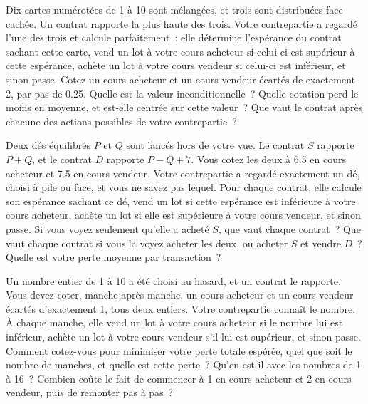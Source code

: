 \begin{question}\label{iq:iv2:making-a-market:30}
Dix cartes numérotées de 1 à 10 sont mélangées, et trois sont distribuées face cachée. Un contrat rapporte la plus haute des trois. Votre contrepartie a regardé l'une des trois et calcule parfaitement~: elle détermine l'espérance du contrat sachant cette carte, vend un lot à votre cours acheteur si celui-ci est supérieur à cette espérance, achète un lot à votre cours vendeur si celui-ci est inférieur, et sinon passe. Cotez un cours acheteur et un cours vendeur écartés de exactement 2, par pas de 0.25. Quelle est la valeur inconditionnelle~? Quelle cotation perd le moins en moyenne, et est-elle centrée sur cette valeur~? Que vaut le contrat après chacune des actions possibles de votre contrepartie~?
\end{question}

\begin{question}\label{iq:iv2:making-a-market:31}
Deux dés équilibrés $P$ et $Q$ sont lancés hors de votre vue. Le contrat $S$ rapporte $P + Q$, et le contrat $D$ rapporte $P - Q + 7$. Vous cotez les deux à 6.5 en cours acheteur et 7.5 en cours vendeur. Votre contrepartie a regardé exactement un dé, choisi à pile ou face, et vous ne savez pas lequel. Pour chaque contrat, elle calcule son espérance sachant ce dé, vend un lot si cette espérance est inférieure à votre cours acheteur, achète un lot si elle est supérieure à votre cours vendeur, et sinon passe. Si vous voyez seulement qu'elle a acheté $S$, que vaut chaque contrat~? Que vaut chaque contrat si vous la voyez acheter les deux, ou acheter $S$ et vendre $D$~? Quelle est votre perte moyenne par transaction~?
\end{question}

\begin{question}\label{iq:iv2:making-a-market:32}
Un nombre entier de 1 à 10 a été choisi au hasard, et un contrat le rapporte. Vous devez coter, manche après manche, un cours acheteur et un cours vendeur écartés d'exactement 1, tous deux entiers. Votre contrepartie connaît le nombre. À chaque manche, elle vend un lot à votre cours acheteur si le nombre lui est inférieur, achète un lot à votre cours vendeur s'il lui est supérieur, et sinon passe. Comment cotez-vous pour minimiser votre perte totale espérée, quel que soit le nombre de manches, et quelle est cette perte~? Qu'en est-il avec les nombres de 1 à 16~? Combien coûte le fait de commencer à 1 en cours acheteur et 2 en cours vendeur, puis de remonter pas à pas~?
\end{question}

